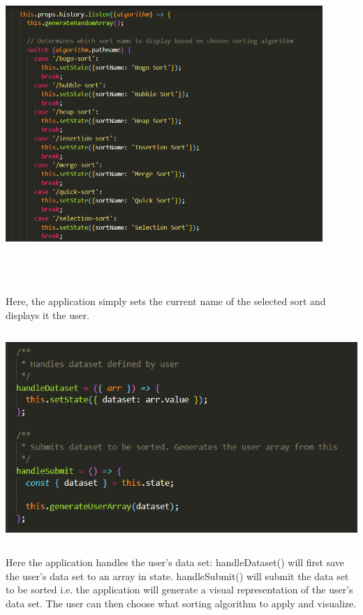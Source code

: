 \begin{center}
    \includegraphics[width=12cm,height=12cm,keepaspectratio]{images/mainpage2}
\end{center}
Here, the application simply sets the current name of the selected sort and displays it the user.

\begin{center}
    \includegraphics[width=15cm,height=8cm,keepaspectratio]{images/mainpage3}
\end{center}
Here the application handles the user's data set: handleDataset() will first save the user's data set to an array in state. handleSubmit() will submit the data set to be sorted i.e. the application will generate a visual representation of the user's data set. The user can then choose what sorting algorithm to apply and visualize.


